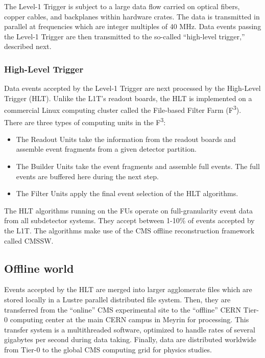 The Level-1 Trigger is subject to a large data flow carried on optical fibers, 
copper cables, and backplanes within hardware crates. 
The data is transmitted in parallel at frequencies which are integer multiples of 40 MHz.
Data events passing the Level-1 Trigger are then transmitted to the so-called ``high-level trigger,'' described next.

\subsubsection{High-Level Trigger}
Data events accepted by the Level-1 Trigger are next processed by the High-Level Trigger (HLT).
Unlike the L1T's readout boards, the HLT is implemented on a commercial Linux computing cluster
called the File-based Filter Farm (F\textsuperscript{3}). There are three types of computing units in the F\textsuperscript{3}:
\begin{itemize}
\item The Readout Units take the information from the readout boards and assemble event fragments from a given detector partition.
\item The Builder Units take the event fragments and assemble full events. The full events are buffered here during the next step.
\item The Filter Units apply the final event selection of the HLT algorithms.
\end{itemize}
The HLT algorithms running on the FUs operate on full-granularity event data
from all subdetector systems. They accept between 1-10\% of events accepted by the L1T.
The algorithms make use of the CMS offline reconstruction framework called CMSSW.

\subsection{Offline world}
Events accepted by the HLT are merged into larger agglomerate files which are stored
locally in a Lustre parallel distributed file system.
Then, they are transferred from the ``online'' CMS experimental site to the
``offline'' CERN Tier-0 computing center at the main CERN campus in Meyrin for processing.
This transfer system is a multithreaded software,
optimized to handle rates of several gigabytes per second during data taking.
Finally, data are distributed worldwide from Tier-0 to the global CMS computing grid for physics studies.
